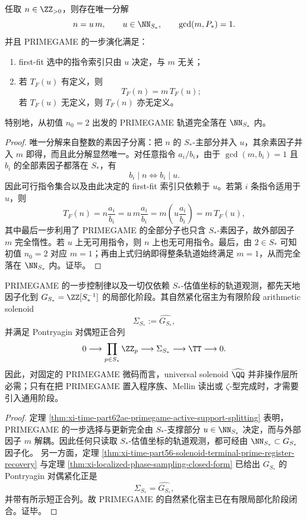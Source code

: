 \begin{theorem}\label{thm:xi-time-part62ae-primegame-active-support-splitting}
任取 \(n\in \ZZ_{>0}\)，则存在唯一分解
\[
n=u\,m,
\qquad
u\in \NN_{S_*},
\qquad
\gcd(m,P_*)=1.
\]
并且 PRIMEGAME 的一步演化满足：
\begin{enumerate}
  \item first-fit 选中的指令索引只由 \(u\) 决定，与 \(m\) 无关；
  \item 若 \(T_F(u)\) 有定义，则
  \[
  T_F(n)=m\,T_F(u);
  \]
  若 \(T_F(u)\) 无定义，则 \(T_F(n)\) 亦无定义。
\end{enumerate}
特别地，从初值 \(n_0=2\) 出发的 PRIMEGAME 轨道完全落在 \(\NN_{S_*}\) 内。
\end{theorem}
\begin{proof}
唯一分解来自整数的素因子分离：把 \(n\) 的 \(S_*\)-主部分并入 \(u\)，其余素因子并入 \(m\) 即得，而且此分解显然唯一。对任意指令 \(a_i/b_i\)，由于 \(\gcd(m,b_i)=1\) 且 \(b_i\) 的全部素因子都落在 \(S_*\)，有
\[
b_i\mid n
\iff
b_i\mid u.
\]
因此可行指令集合以及由此决定的 first-fit 索引只依赖于 \(u\)。若第 \(i\) 条指令适用于 \(u\)，则
\[
T_F(n)
=
n\frac{a_i}{b_i}
=
u\,m\frac{a_i}{b_i}
=
m\left(u\frac{a_i}{b_i}\right)
=
m\,T_F(u),
\]
其中最后一步利用了 PRIMEGAME 的全部分子也只含 \(S_*\)-素因子，故外部因子 \(m\) 完全惰性。若 \(u\) 上无可用指令，则 \(n\) 上也无可用指令。最后，由 \(2\in S_*\) 可知初值 \(n_0=2\) 对应 \(m=1\)；再由上式归纳即得整条轨道始终满足 \(m=1\)，从而完全落在 \(\NN_{S_*}\) 内。证毕。
\end{proof}

\begin{corollary}\label{cor:xi-time-part62ae-primegame-finite-solenoidal-host}
PRIMEGAME 的一步控制律以及一切仅依赖 \(S_*\)-估值坐标的轨道观测，都先天地因子化到 \(G_{S_*}=\ZZ[S_*^{-1}]\) 的局部化阶段。其自然紧化宿主为有限阶段 arithmetic solenoid
\[
\Sigma_{S_*}:=\widehat{G_{S_*}},
\]
并满足 Pontryagin 对偶短正合列
\[
0\longrightarrow \prod_{p\in S_*}\ZZ_p
\longrightarrow \Sigma_{S_*}
\longrightarrow \TT
\longrightarrow 0.
\]
因此，对固定的 PRIMEGAME 微码而言，universal solenoid \(\widehat{\QQ}\) 并非操作层所必需；只有在把 PRIMEGAME 置入程序族、Mellin 读出或 \(\zeta\)-型完成时，才需要引入通用阶段。
\end{corollary}
\begin{proof}
定理 \ref{thm:xi-time-part62ae-primegame-active-support-splitting} 表明，PRIMEGAME 的一步选择与更新完全由 \(S_*\)-支撑部分 \(u\in \NN_{S_*}\) 决定，而与外部因子 \(m\) 解耦。因此任何只读取 \(S_*\)-估值坐标的轨道观测，都可经由 \(\NN_{S_*}\subset G_{S_*}\) 因子化。
另一方面，定理 \ref{thm:xi-time-part56-solenoid-terminal-prime-register-recovery} 与定理 \ref{thm:xi-localized-phase-sampling-closed-form} 已给出 \(G_{S_*}\) 的 Pontryagin 对偶紧化正是
\[
\Sigma_{S_*}=\widehat{G_{S_*}},
\]
并带有所示短正合列。故 PRIMEGAME 的自然紧化宿主已在有限局部化阶段闭合。证毕。
\end{proof}

